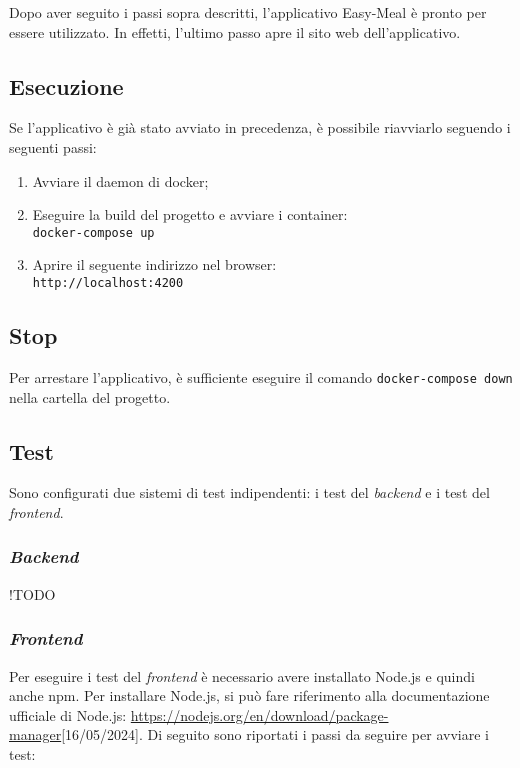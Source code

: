 Dopo aver seguito i passi sopra descritti, l'applicativo Easy-Meal è pronto per
essere utilizzato. In effetti, l'ultimo passo apre il sito web dell'applicativo.

\subsection{Esecuzione}

Se l'applicativo è già stato avviato in precedenza, è possibile riavviarlo
seguendo i seguenti passi:

\begin{enumerate}
	\item Avviare il daemon di docker;

	\item Eseguire la build del progetto e avviare i container: \\
		\texttt{docker-compose up}

	\item Aprire il seguente indirizzo nel browser: \\
		\texttt{http://localhost:4200}
\end{enumerate}

\subsection{Stop}

Per arrestare l'applicativo, è sufficiente eseguire il comando
\texttt{docker-compose down} nella cartella del progetto.

\subsection{Test}

Sono configurati due sistemi di test indipendenti: i test del \textit{backend} e
i test del \textit{frontend}.

\subsubsection{\textit{Backend}}

!TODO

\subsubsection{\textit{Frontend}} 

Per eseguire i test del \textit{frontend} è necessario avere installato Node.js 
e quindi anche npm. Per installare Node.js, si può fare riferimento alla
documentazione ufficiale di Node.js:
\url{https://nodejs.org/en/download/package-manager}[16/05/2024]. 
Di seguito sono riportati i passi da seguire per avviare i test:

